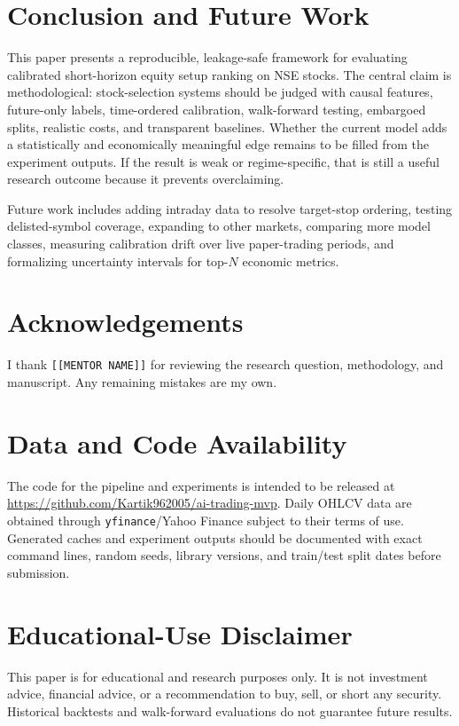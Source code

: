 \documentclass[11pt]{article}
\begin{document}
\section{Conclusion and Future Work}

This paper presents a reproducible, leakage-safe framework for evaluating
calibrated short-horizon equity setup ranking on NSE stocks. The central claim
is methodological: stock-selection systems should be judged with causal
features, future-only labels, time-ordered calibration, walk-forward testing,
embargoed splits, realistic costs, and transparent baselines. Whether the
current model adds a statistically and economically meaningful edge remains to
be filled from the experiment outputs. If the result is weak or regime-specific,
that is still a useful research outcome because it prevents overclaiming.

Future work includes adding intraday data to resolve target-stop ordering,
testing delisted-symbol coverage, expanding to other markets, comparing more
model classes, measuring calibration drift over live paper-trading periods, and
formalizing uncertainty intervals for top-$N$ economic metrics.

\section*{Acknowledgements}

I thank \texttt{[[MENTOR NAME]]} for reviewing the research question,
methodology, and manuscript. Any remaining mistakes are my own.

\section*{Data and Code Availability}

The code for the pipeline and experiments is intended to be released at
\url{https://github.com/Kartik962005/ai-trading-mvp}. Daily OHLCV data are
obtained through \texttt{yfinance}/Yahoo Finance subject to their terms of use.
Generated caches and experiment outputs should be documented with exact command
lines, random seeds, library versions, and train/test split dates before
submission.

\section*{Educational-Use Disclaimer}

This paper is for educational and research purposes only. It is not investment
advice, financial advice, or a recommendation to buy, sell, or short any
security. Historical backtests and walk-forward evaluations do not guarantee
future results.
\end{document}
